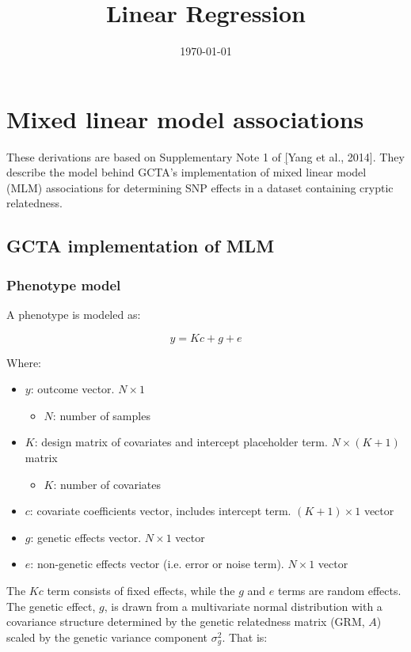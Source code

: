 \documentclass[12pt]{article}
\title{Linear Regression}
\date{\today}
\begin{document}
\maketitle

\section{Mixed linear model associations}

These derivations are based on Supplementary Note 1 of \href{https://www.nature.com/articles/ng.2876}[Yang et al., 2014]. They describe the model behind GCTA's implementation of mixed linear model (MLM) associations for determining SNP effects in a dataset containing cryptic relatedness.

\subsection{GCTA implementation of MLM}

\subsubsection{Phenotype model}
A phenotype is modeled as:

$$ y = Kc + g + e $$

Where:

\begin{itemize}
    \item $y$: outcome vector. $N \times 1$
    \begin{itemize}
        \item $N$: number of samples
    \end{itemize}
    \item $K$: design matrix of covariates and intercept placeholder term. $N \times (K+1)$ matrix
    \begin{itemize}
        \item $K$: number of covariates
    \end{itemize}
    \item $c$: covariate coefficients vector, includes intercept term. $(K+1) \times 1$ vector
    \item $g$: genetic effects vector. $N \times 1$ vector
    \item $e$: non-genetic effects vector (i.e. error or noise term). $N \times 1$ vector
\end{itemize}

The $Kc$ term consists of fixed effects, while the $g$ and $e$ terms are random effects.
The genetic effect, $g$, is drawn from a multivariate normal distribution with a covariance structure determined by the genetic relatedness matrix (GRM, $A$) scaled by the genetic variance component $\sigma_g^2$. That is:
\end{document}
